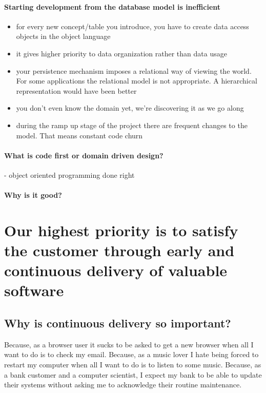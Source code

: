 \documentclass{article}
\begin{document}
\paragraph{Starting development from the database model is inefficient}
\begin{itemize} 
\item for every new concept/table you introduce, you have to create
  data access objects in the object language

\item it gives higher priority to data organization rather than data
  usage
\item your persistence mechanism imposes a relational way of viewing
  the world. For some applications the relational model is not
  appropriate. A hierarchical representation would have been better

\item you don't even know the domain yet, we're discovering it as we
  go along
\item during the ramp up stage of the project there are frequent
  changes to the model. That means constant code churn
\end{itemize}

\paragraph{What is code first or domain driven design?}
- object oriented programming done right

\paragraph{Why is it good?}




\section{Our highest priority is to satisfy the customer through early and continuous delivery of valuable software}

\subsection{Why is continuous delivery so important?}

%
Because, as a browser user it sucks to be asked to get a new browser
when all I want to do is to check my email.
%
Because, as a music lover I hate being forced to restart my computer
when all I want to do is to listen to some music.
%
Because, as a bank customer and a computer scientist, I expect my bank
to be able to update their systems without asking me to acknowledge
their routine maintenance.
%
 
\end{document}
